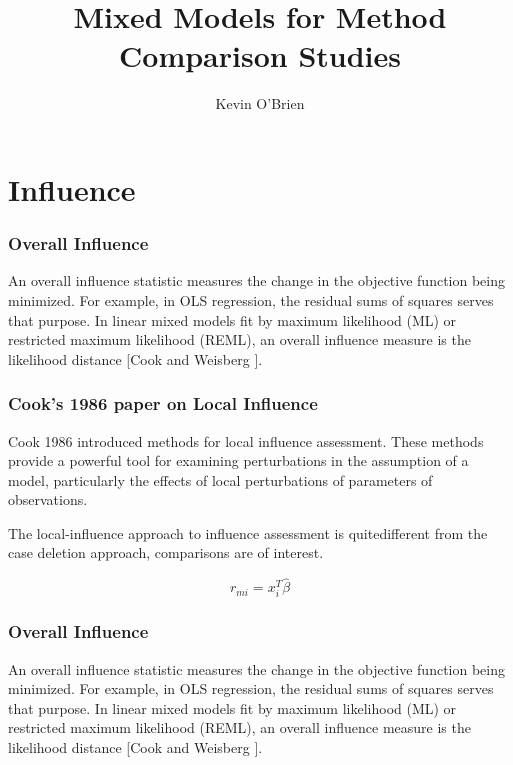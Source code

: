 \documentclass[12pt, a4paper]{article}
\begin{document}
	\author{Kevin O'Brien}
	\title{Mixed Models for Method Comparison Studies}
	\tableofcontents
\chapter{Influence}
	
	
	\subsection{Overall Influence}
	An overall influence statistic measures the change in the objective function being minimized. For example, in
	OLS regression, the residual sums of squares serves that purpose. In linear mixed models fit by
	 maximum likelihood (ML) or  restricted maximum likelihood (REML), an overall influence measure is the  likelihood distance [Cook and Weisberg ].
	
	

	\subsection{Cook's 1986 paper on Local Influence}%
	Cook 1986 introduced methods for local influence assessment. These methods provide a powerful tool for examining perturbations in the assumption of a model, particularly the effects of local perturbations of parameters of observations.
	
	The local-influence approach to influence assessment is quitedifferent from the case deletion approach, comparisons are of
	interest.
	
	
	
	
	\begin{equation}
	r_{mi}=x^{T}_{i}\hat{\beta}
	\end{equation}
	



\subsection{Overall Influence}
An overall influence statistic measures the change in the objective function being minimized. For example, in
OLS regression, the residual sums of squares serves that purpose. In linear mixed models fit by
 maximum likelihood (ML) or  restricted maximum likelihood (REML), an overall influence measure is the  likelihood distance [Cook and Weisberg ].
\end{document}
